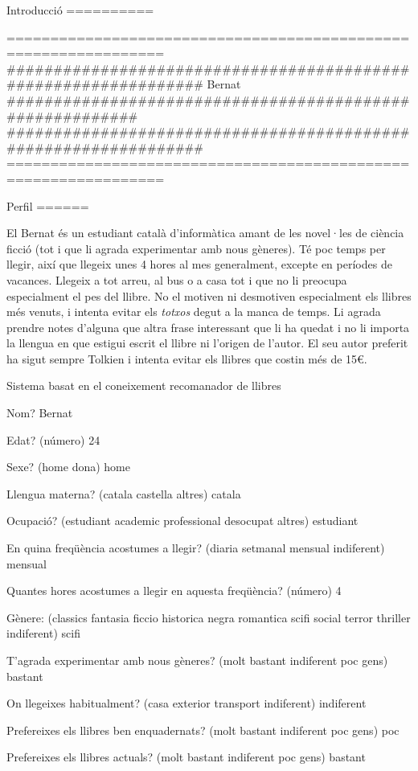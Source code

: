 
Introducció
==========

================================================================
################################################################
Bernat #########################################################
################################################################
================================================================


Perfil
======

El Bernat és un estudiant català d'informàtica amant de les novel·les de ciència ficció (tot i que li agrada experimentar amb nous gèneres). Té poc temps per llegir, així que llegeix unes 4 hores al mes generalment, excepte en períodes de vacances. Llegeix a tot arreu, al bus o a casa tot i que no li preocupa especialment el pes del llibre. No el motiven ni desmotiven especialment els llibres més venuts, i intenta evitar els \emph{totxos} degut a la manca de temps. Li agrada prendre notes d'alguna que altra frase interessant que li ha quedat i no li importa la llengua en que estigui escrit el llibre ni l'origen de l'autor. El seu autor preferit ha sigut sempre Tolkien i intenta evitar els llibres que costin més de 15€. 


Sistema basat en el coneixement recomanador de llibres

Nom? Bernat

Edat?  (número) 24

Sexe? (home dona) home

Llengua materna? (catala castella altres) catala

Ocupació? (estudiant academic professional desocupat altres) estudiant

En quina freqüència acostumes a llegir? (diaria setmanal mensual indiferent) mensual

Quantes hores acostumes a llegir en aquesta freqüència? (número) 4

Gènere:  (classics fantasia ficcio historica negra romantica scifi social terror thriller indiferent) scifi

T'agrada experimentar amb nous gèneres? (molt bastant indiferent poc gens) bastant

On llegeixes habitualment? (casa exterior transport indiferent) indiferent

Prefereixes els llibres ben enquadernats? (molt bastant indiferent poc gens) poc

Prefereixes els llibres actuals? (molt bastant indiferent poc gens) bastant   

